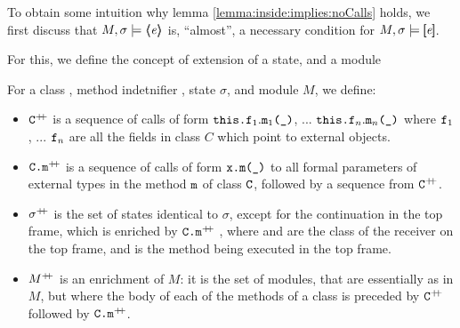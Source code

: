 \documentclass[acmsmall,review,anonymous,screen]{acmart}\settopmatter{printfolios=true,printacmref=false}
\begin{document}
{To obtain some intuition why lemma \ref{lemma:inside:implies:noCalls} holds, we first discuss that $M , \sigma \models \langle\!\!\langle \mathit{e} \rangle\!\!\rangle $ is, 
``almost'',  a necessary condition for $M , \sigma \models [\!\![ \mathit{e} ]\!\!] $. 

For this, we define the concept of extension of a state, and a module

\begin{definition}
For a class , method indetnifier , state $\sigma$, and module $M$, we define:

\begin{itemize}

\item
${\mbox{\normalfont{\texttt{C}}}^{+\!\!+}}$ is a sequence of calls of form $\mbox{\normalfont{\texttt{this.f}}}_1.\mbox{\normalfont{\texttt{m}}}_1\mbox{\normalfont{\texttt{(\_)}}}$, ... $\mbox{\normalfont{\texttt{this.f}}}_n.\mbox{\normalfont{\texttt{m}}}_n\mbox{\normalfont{\texttt{(\_)}}}$  where $\mbox{\normalfont{\texttt{f}}}_1$, ... $\mbox{\normalfont{\texttt{f}}}_n$  are all the fields in class $C$ which point to external objects.

\item 
${\mbox{\normalfont{\texttt{C.m}}}^{+\!\!+}}$ is a sequence of calls of form $\mbox{\normalfont{\texttt{x.m(\_)}}}$  to all  formal parameters of external types in the method $\mbox{\normalfont{\texttt{m}}}$ of class  $\mbox{\normalfont{\texttt{C}}}$, followed by a sequence from ${\mbox{\normalfont{\texttt{C}}}^{+\!\!+}}$.

 \item
  ${\sigma^{+\!\!+}}$   is  the set of  states identical to $\sigma$, except for the continuation in the top frame, which is enriched by 
 ${\mbox{\normalfont{\texttt{C.m}}}^{+\!\!+}}$ , where  and  are the class  of the receiver on the top frame, and  is the method being executed in the top frame. 
\item
${M^{+\!\!+}}$ is an enrichment of $M$: 
it is the set of modules, that are essentially as in $M$, but where 
the body of each of the methods  of a class  is preceded by ${\mbox{\normalfont{\texttt{C}}}^{+\!\!+}}$  followed by ${\mbox{\normalfont{\texttt{C.m}}}^{+\!\!+}}$.
\end{itemize}
\end{definition}

}
\end{document}
